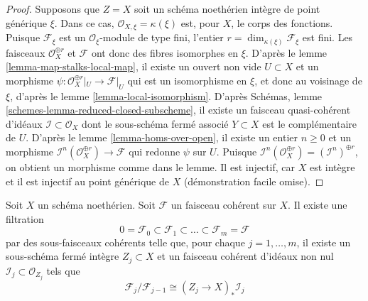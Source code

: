 \begin{proof}
\medskip\noindent
Supposons que $Z = X$ soit un schéma noethérien intègre de point générique $\xi$.
Dans ce cas, $\mathcal{O}_{X, \xi} = \kappa(\xi)$ est, pour $X$, le corps
des fonctions.
Puisque $\mathcal{F}_\xi$ est un $\mathcal{O}_\xi$-module de type fini,
l'entier $r = \dim_{\kappa(\xi)} \mathcal{F}_\xi$ est fini.
Les faisceaux $\mathcal{O}_X^{\oplus r}$ et $\mathcal{F}$
ont donc des fibres isomorphes en $\xi$.
D'après le lemme \ref{lemma-map-stalks-local-map}, il existe un ouvert non
vide $U \subset X$ et un morphisme
$\psi : \mathcal{O}_X^{\oplus r}|_U \to \mathcal{F}|_U$
qui est un isomorphisme
en $\xi$, et donc au voisinage de $\xi$, d'après
le lemme \ref{lemma-local-isomorphism}.
D'après Schémas, lemme \ref{schemes-lemma-reduced-closed-subscheme},
il existe un faisceau quasi-cohérent d'idéaux
$\mathcal{I} \subset \mathcal{O}_X$
dont le sous-schéma fermé associé $Y \subset X$ est le complémentaire
de $U$.
D'après le lemme \ref{lemma-homs-over-open}, il existe un entier $n \geq 0$ et un morphisme
$\mathcal{I}^n(\mathcal{O}_X^{\oplus r}) \to \mathcal{F}$
qui redonne $\psi$ sur $U$. Puisque
$\mathcal{I}^n(\mathcal{O}_X^{\oplus r}) = (\mathcal{I}^n)^{\oplus r}$,
on obtient un morphisme comme dans le lemme. Il est injectif, car $X$ est
intègre et il est injectif au point générique de $X$
(démonstration facile omise).
\end{proof}

\begin{lemma}
\label{lemma-coherent-filter}
Soit $X$ un schéma noethérien.
Soit $\mathcal{F}$ un faisceau cohérent sur $X$.
Il existe une filtration
$$
0 = \mathcal{F}_0 \subset \mathcal{F}_1 \subset
\ldots \subset \mathcal{F}_m = \mathcal{F}
$$
par des sous-faisceaux cohérents telle que, pour chaque $j = 1, \ldots, m$,
il existe un sous-schéma fermé intègre $Z_j \subset X$ et
un faisceau cohérent d'idéaux non nul $\mathcal{I}_j \subset \mathcal{O}_{Z_j}$
tels que
$$
\mathcal{F}_j/\mathcal{F}_{j - 1}
\cong (Z_j \to X)_* \mathcal{I}_j
$$
\end{lemma}

